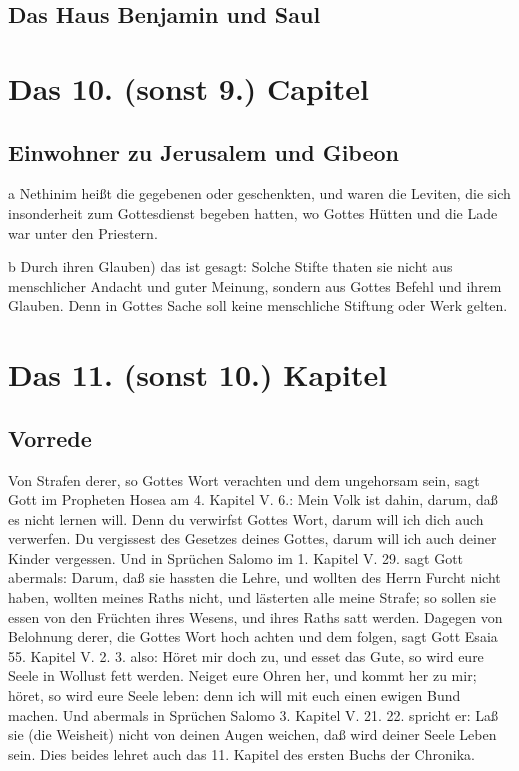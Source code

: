 \section[Das Haus Benjamin und Saul]{Das Haus Benjamin und Saul}

\chapter{Das 10. (sonst 9.) Capitel}

\section[Einwohner zu Jerusalem und Gibeon]{Einwohner zu Jerusalem und Gibeon}

a Nethinim heißt die gegebenen oder geschenkten, und waren die Leviten, die sich insonderheit zum Gottesdienst begeben hatten, wo Gottes Hütten und die Lade war unter den Priestern.

b Durch ihren Glauben) das ist gesagt: Solche Stifte thaten sie nicht aus menschlicher Andacht und guter Meinung, sondern aus Gottes Befehl und ihrem Glauben. Denn in Gottes Sache soll keine menschliche Stiftung oder Werk gelten.

\chapter{Das 11. (sonst 10.) Kapitel}

\section{Vorrede}

Von Strafen derer, so Gottes Wort verachten und dem ungehorsam sein, sagt Gott im Propheten Hosea am 4. Kapitel V. 6.: Mein Volk ist dahin, darum, daß es nicht lernen will. Denn du verwirfst Gottes Wort, darum will ich dich auch verwerfen. Du vergissest des Gesetzes deines Gottes, darum will ich auch deiner Kinder vergessen. Und in Sprüchen Salomo im 1. Kapitel V. 29. sagt Gott abermals: Darum, daß sie hassten die Lehre, und wollten des Herrn Furcht nicht haben, wollten meines Raths nicht, und lästerten alle meine Strafe; so sollen sie essen von den Früchten ihres Wesens, und ihres Raths satt werden. Dagegen von Belohnung derer, die Gottes Wort hoch achten und dem folgen, sagt Gott Esaia 55. Kapitel V. 2. 3. also: Höret mir doch zu, und esset das Gute, so wird eure Seele in Wollust fett werden. Neiget eure Ohren her, und kommt her zu mir; höret, so wird eure Seele leben: denn ich will mit euch einen ewigen Bund machen. Und abermals in Sprüchen Salomo 3. Kapitel V. 21. 22. spricht er: Laß sie (die Weisheit) nicht von deinen Augen weichen, daß wird deiner Seele Leben sein. Dies beides lehret auch das 11. Kapitel des ersten Buchs der Chronika.

